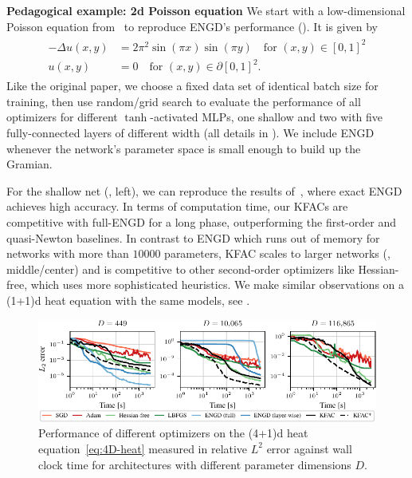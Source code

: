 \textbf{Pedagogical example: 2d Poisson equation}
We start with a low-dimensional Poisson equation from~\citet{muller2023achieving} to reproduce ENGD's performance ().
It is given by
\begin{align}\label{eq:2D-Poisson}
  \begin{split}
    -\Delta u(x,y) & = 2\pi^2 \sin(\pi x) \sin(\pi y) \quad \text{for } (x,y)\in[0,1]^2 \\
    u(x,y) & = 0 \quad \text{for } (x,y) \in\partial[0,1]^2.
  \end{split}
\end{align}
Like the original paper, we choose a fixed data set of identical batch size for training, then use random/grid search to evaluate the performance of all optimizers for different $\tanh$-activated MLPs, one shallow and two with five fully-connected layers of different width (all details in ).
We include ENGD whenever the network's parameter space is small enough to build up the Gramian.

For the shallow net (, left), we can reproduce the results of~\cite{muller2023achieving}, where exact ENGD achieves high accuracy.
In terms of computation time, our KFACs are competitive with full-ENGD for a long phase, outperforming the first-order and quasi-Newton baselines.
In contrast to ENGD which runs out of memory for networks with more than $\num{10000}$ parameters, KFAC scales to larger networks (, middle/center) and is competitive to other second-order optimizers like Hessian-free, which uses more sophisticated heuristics.
We make similar observations on a (1+1)d heat equation with the same models, see .

\begin{figure}
  \centering
  \includegraphics{../kfac_pinns_exp/exp30_heat4d_groupplot/l2_error_over_time.pdf}
  \caption{Performance of different optimizers on the (4+1)d heat equation~\eqref{eq:4D-heat} measured in relative $L^2$ error against wall clock time for architectures with different parameter dimensions $D$.}
  \label{fig:4D-heat}
\end{figure}

